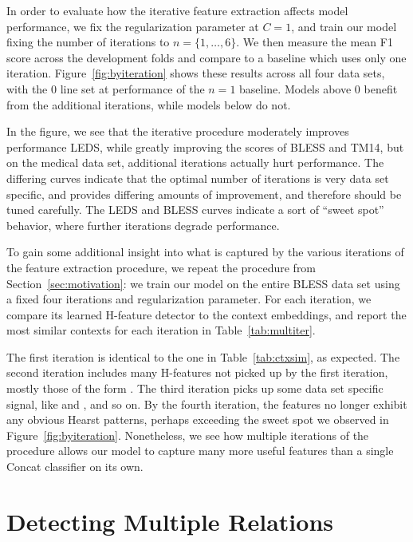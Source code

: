 In order to evaluate how the iterative feature extraction affects model
performance, we fix the regularization parameter at $C = 1$, and train our
model fixing the number of iterations to $n = \{1, \ldots, 6\}$.
We then measure the mean F1 score across the development folds and compare to a
baseline which uses only one iteration. Figure~\ref{fig:byiteration} shows
these results across all four data sets, with the 0 line set at performance of
the $n = 1$ baseline. Models above 0 benefit from the additional
iterations, while models below do not.

In the figure, we see that the iterative procedure moderately improves
performance LEDS, while greatly improving the scores of BLESS and TM14, but
on the medical data set, additional iterations actually hurt performance.
The differing curves indicate that the optimal number of iterations is very
data set specific, and provides differing amounts of improvement, and therefore
should be tuned carefully. The LEDS and BLESS curves indicate a sort of
``sweet spot'' behavior, where further iterations degrade performance.

To gain some additional insight into what is captured by the various iterations
of the feature extraction procedure, we repeat the procedure from
Section~\ref{sec:motivation}: we train our model on the entire BLESS data set
using a fixed four iterations and regularization parameter. For each iteration,
we compare its learned H-feature detector to the context embeddings, and report
the most similar contexts for each iteration in Table~\ref{tab:multiter}.

The first iteration is identical to the one in Table~\ref{tab:ctxsim}, as
expected. The second iteration includes many H-features not picked up by the
first iteration, mostly those of the form . The
third iteration picks up some data set specific signal, like  and , and so on. By the fourth iteration,
the features no longer exhibit any obvious Hearst patterns, perhaps exceeding
the sweet spot we observed in Figure~\ref{fig:byiteration}.  Nonetheless, we
see how multiple iterations of the procedure allows our model to capture many
more useful features than a single Concat classifier on its own.

\section{Detecting Multiple Relations}

